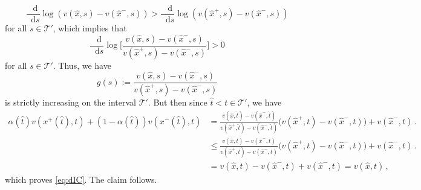 \documentclass[12pt,letterpaper]{article}
\newenvironment{original}{\color{black}\noindent}{}
\theoremstyle{plain}
\theoremstyle{definition}
\theoremstyle{remark}
\renewcommand{\1}{\mathds{1}}
\renewcommand*\d{\mathop{}\!\mathrm{d}}
\theoremstyle{definition}
\begin{document}
\begin{original}
\[ \frac{\d}{\d s}   \log(v(\hat{x}, s) - v(\hat{x}^-, s))  >  \frac{\d}{\d s}   \log(v(\hat{x}^+, s) - v(\hat{x}^-, s))\]
for all $s \in \mathcal{T}'$, which implies that
\[ \frac{\d}{\d s}   \log\Bigg[\frac{v(\hat{x}, s) - v(\hat{x}^-, s)}{v(\hat{x}^+, s) - v(\hat{x}^-, s)}\Bigg]  >  0\]
for all $s \in \mathcal{T}'$. Thus, we have
\[g(s):= \frac{v(\hat{x}, s) - v(\hat{x}^-, s)}{v(\hat{x}^+, s) - v(\hat{x}^-, s)}\]
is strictly increasing on the interval $\mathcal{T}'$. But then since $\hat{t} < t \in \mathcal{T}'$, we have
\begin{align*}
\alpha(\hat{t}) v(x^{+}(\hat{t}), t) + (1 - \alpha(\hat{t})) v(x^{-}(\hat{t}), t)
 &= \frac{v(\hat{x}, \hat{t}) - v(\hat{x}^{-}, \hat{t})}{ v(\hat{x}^{+}, \hat{t}) -  v(\hat{x}^{-}, \hat{t})}\big(v(\hat{x}^+, t) - v(\hat{x}^-, t)\big) +v(\hat{x}^-, t)\,. \\
 &\leq \frac{v(\hat{x}, t) - v(\hat{x}^{-}, t)}{ v(\hat{x}^{+}, t) -  v(\hat{x}^{-}, t)}\big(v(\hat{x}^+, t) - v(\hat{x}^-, t)\big) +v(\hat{x}^-, t)\,. \\
  &= v(\hat{x}, t) - v(\hat{x}^{-}, t) +v(\hat{x}^-, t) = v(\hat{x}, t)\,,
\end{align*}
which proves \eqref{eq:dIC}. The claim follows.
\end{original}
\end{document}

